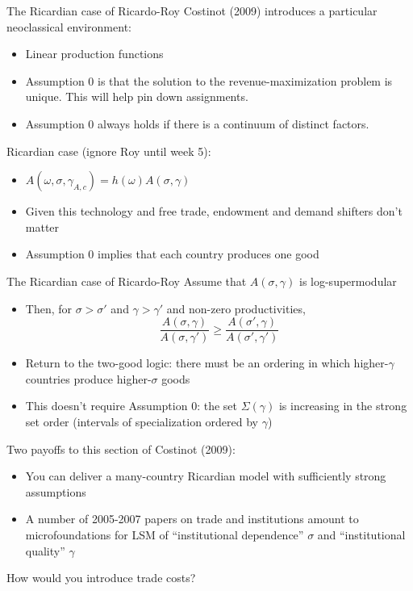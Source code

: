 \documentclass[10pt,notes=hide]{beamer}
\begin{document}
\begin{frame}{The Ricardian case of Ricardo-Roy}
Costinot (2009) introduces a particular neoclassical environment:
\begin{itemize}
	\item Linear production functions
	\item Assumption 0 is that the solution to the revenue-maximization problem is unique.
		This will help pin down assignments.
	\item Assumption 0 always holds if there is a continuum of distinct factors.
\end{itemize}
Ricardian case (ignore Roy until week 5):
\begin{itemize}
	\item $A(\omega,\sigma,\gamma_{A,c}) = h(\omega)A(\sigma,\gamma)$
	\item Given this technology and free trade, endowment and demand shifters don't matter
	\item Assumption 0 implies that each country produces one good
\end{itemize}
\end{frame}
\begin{frame}{The Ricardian case of Ricardo-Roy}
Assume that $A(\sigma,\gamma)$ is log-supermodular
\begin{itemize}
	\item Then, for $\sigma > \sigma'$ and $\gamma > \gamma'$ and non-zero productivities,
		\begin{equation*}\frac{A(\sigma,\gamma)}{A(\sigma,\gamma')} \geq \frac{A(\sigma',\gamma)}{A(\sigma',\gamma')}\end{equation*}
	\item Return to the two-good logic:
	there must be an ordering in which higher-$\gamma$ countries produce higher-$\sigma$ goods
	\item This doesn't require Assumption 0: the set $\Sigma(\gamma)$ is increasing in the strong set order (intervals of specialization ordered by $\gamma$)
\end{itemize}
Two payoffs to this section of Costinot (2009):
\begin{itemize}
	\item You can deliver a many-country Ricardian model with sufficiently strong assumptions
	\item A number of 2005-2007 papers on trade and institutions amount to microfoundations for LSM of ``institutional dependence'' $\sigma$ and ``institutional quality'' $\gamma$
\end{itemize}
How would you introduce trade costs?
\end{frame}
\end{document}
